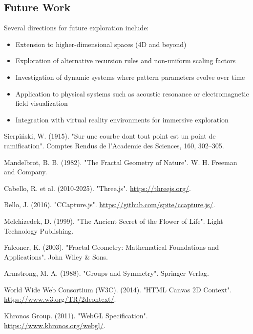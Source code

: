 \documentclass[12pt,a4paper]{article}
\begin{document}
\subsection{Future Work}
Several directions for future exploration include:

\begin{itemize}
    \item Extension to higher-dimensional spaces (4D and beyond)
    \item Exploration of alternative recursion rules and non-uniform scaling factors
    \item Investigation of dynamic systems where pattern parameters evolve over time
    \item Application to physical systems such as acoustic resonance or electromagnetic field visualization
    \item Integration with virtual reality environments for immersive exploration
\end{itemize}

\begin{thebibliography}{9}
 Sierpiński, W. (1915). "Sur une courbe dont tout point est un point de ramification". Comptes Rendus de l'Academie des Sciences, 160, 302–305.

 Mandelbrot, B. B. (1982). "The Fractal Geometry of Nature". W. H. Freeman and Company.

 Cabello, R. et al. (2010-2025). "Three.js". \url{https://threejs.org/}.

 Bello, J. (2016). "CCapture.js". \url{https://github.com/spite/ccapture.js/}.

 Melchizedek, D. (1999). "The Ancient Secret of the Flower of Life". Light Technology Publishing.

 Falconer, K. (2003). "Fractal Geometry: Mathematical Foundations and Applications". John Wiley & Sons.

 Armstrong, M. A. (1988). "Groups and Symmetry". Springer-Verlag.

 World Wide Web Consortium (W3C). (2014). "HTML Canvas 2D Context". \url{https://www.w3.org/TR/2dcontext/}.

 Khronos Group. (2011). "WebGL Specification". \url{https://www.khronos.org/webgl/}.
\end{thebibliography}
\end{document}
